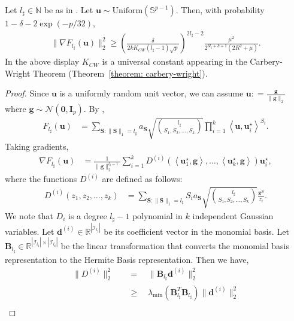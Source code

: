 \documentclass[final,12pt]{colt2018} %
\newcommand{\N}{\mathbb{N}}
\newcommand{\R}{\mathbb{R}}
\newcommand{\unitsphere}[1]{\mathbb{S}^{#1}}
\newcommand{\gauss}[2]{\mathcal{N}\left( #1,#2 \right)}
\renewcommand\v[1]{{\ensuremath{\boldsymbol{#1}}}}
\newcommand\ip[1]{\left\langle #1 \right\rangle}
\newcommand{\lambdamin}[1]{\lambda_{\text{min}} \left( #1 \right)}
\begin{document}
\begin{lemma}%
Let $l_\sharp \in \N$ be as in . Let $\v u \sim \text{Uniform}(\unitsphere{p-1})$. Then, with probability $1-\delta - 2\exp(-p/32)$,
\begin{align*}
    \| \nabla F_{l_\sharp}(\v u) \|_2^2 \geq \left( \frac{\delta}{2kK_{CW}(l_\sharp-1)\sqrt{p}} \right)^{2l_\sharp-2} \frac{\mu^2}{2^{3l_\sharp+k+1}(2R^2+\mu)}.
\end{align*}
In the above display $K_{CW}$ is a universal constant appearing in the Carbery-Wright Theorem (Theorem~\ref{theorem: carbery-wright}).
\label{lemma: grad_anticonc_multiindex_restated}
\end{lemma}
\begin{proof}
Since $\v u$ is a uniformly random unit vector, we can assume $\v u : = \frac{\v g}{\| \v g\|_2}$ where $\v g \sim \gauss{\v 0}{\v I_p}$. By , 
\begin{align*}
    F_{l_\sharp}(\v u) & = \sum_{{\v S}: \|{\v S}\|_1 = l_\sharp} a_{\v S} \sqrt{\binom{l_\sharp}{S_1, S_2, \dotsc, S_k}} \prod_{i=1}^k \ip{\v u, \v u_i^\star}^{S_i}.
\end{align*}
Taking gradients, 
\begin{align}
    \nabla F_{l_\sharp}(\v u) & = \frac{1}{\|\v g\|_2^{l_\sharp-1}} \sum_{i=1}^k D^{(i)}(\ip{\v u_1^\star ,\v g}, \dotsc, \ip{\v u_k^\star, \v g}) \v u_i^\star, \label{eq: anticoncentration_gradient_eq1}
\end{align}
where the functions $D^{(i)}$ are defined as follows:
\begin{align*}
    D^{(i)}(z_1,z_2, \dotsc, z_k) & = \sum_{{\v S}: \|{\v S}\|_1 = l_\sharp} S_i a_{\v S} \sqrt{\binom{l_\sharp}{S_1,S_2, \dotsc, S_k}} \frac{\v z^S}{z_i}.
\end{align*}
We note that $D_i$ is a degree $l_\sharp - 1$ polynomial in $k$ independent Gaussian variables. Let $\v d^{(i)} \in \R^{|\mathcal{I}_{l_\sharp}|}$ be its coefficient vector in the monomial basis. Let $\v B_{l_\sharp} \in \R^{|\mathcal{I}_{l_\sharp}|\times|\mathcal{I}_{l_\sharp}|}$ be the linear transformation that converts the monomial basis representation to the Hermite Basis representation. Then we have,
\begin{align*}
    \| D^{(i)} \|^2_2 & \quad = \quad \| \v B_{l_\sharp} \v d^{(i)} \|_2^2 \\
    & \quad \geq \quad \lambdamin{\v B^T_{l_\sharp} \v B_{l_\sharp}} \| \v d^{(i)} \|^2_2 \\

\end{align*}
\end{proof}
\end{document}
